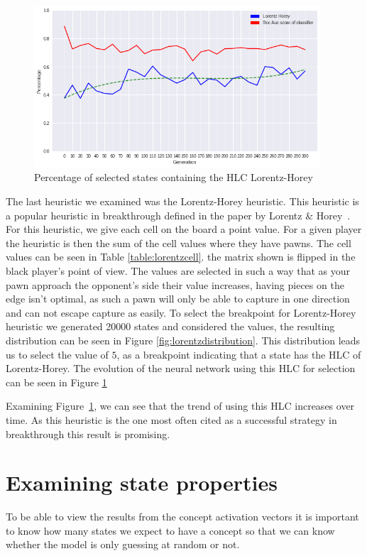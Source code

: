 \begin{figure}
    \begin{small}
        \begin{center}
            \includegraphics[width=0.95\textwidth]{graphics/lorentz_horey_trend.png}
        \end{center}
        \caption{Percentage of selected states containing the HLC Lorentz-Horey}
        \label{fig:lorentzheuristic}
    \end{small}
\end{figure}


The last heuristic we examined was the Lorentz-Horey heuristic. This heuristic is a popular heuristic in breakthrough defined in the paper by Lorentz \& Horey~\cite{lorentz:heuristic}. For this heuristic, we give each cell on the board a point value. For a given player the heuristic is then the sum of the cell values where they have pawns. The cell values can be seen in Table \ref{table:lorentzcell}. the matrix shown is flipped in the black player's point of view. The values are selected in such a way that as your pawn approach the opponent's side their value increases, having pieces on the edge isn't optimal, as such a pawn will only be able to capture in one direction and can not escape capture as easily. To select the breakpoint for Lorentz-Horey heuristic we generated 20000 states and considered the values, the resulting distribution can be seen in Figure \ref{fig:lorentzdistribution}. This distribution leads us to select the value of $5$, as a breakpoint indicating that a state has the HLC of Lorentz-Horey. The evolution of the neural network using this HLC for selection can be seen in Figure \ref{fig:lorentzheuristic}

Examining Figure~\ref{fig:lorentzheuristic}, we can see that the trend of using this HLC increases over time. As this heuristic is the one most often cited as a successful strategy in breakthrough this result is promising.

\section{Examining state properties}

To be able to view the results from the concept activation vectors it is important to know how many states we expect to have a concept so that we can know whether the model is only guessing at random or not.